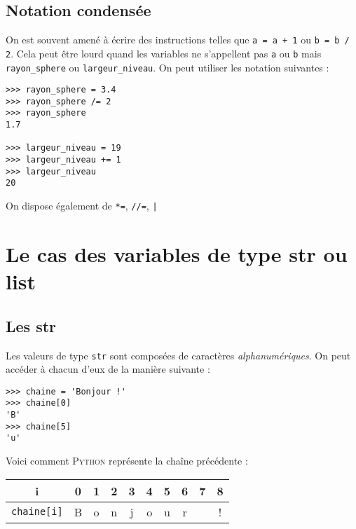 \subsection{Notation condensée}
On est souvent amené à écrire des instructions telles que  \texttt{a = a + 1} ou \texttt{b = b / 2}. Cela peut être lourd quand les variables ne s'appellent
pas \texttt{a} ou \texttt{b} mais \texttt{rayon_sphere} ou \texttt{largeur_niveau}. On peut utiliser les notation suivantes :
\begin{pyc}\begin{verbatim}
>>> rayon_sphere = 3.4
>>> rayon_sphere /= 2
>>> rayon_sphere
1.7

>>> largeur_niveau = 19
>>> largeur_niveau += 1
>>> largeur_niveau
20
\end{verbatim}
\end{pyc}

On dispose également de \texttt{*=}, \texttt{//=}, \texttt|%

\section{Le cas des variables de type str ou list}

\subsection{Les str}

Les valeurs de type \texttt{str} sont composées de caractères \emph{alphanumériques}. On peut accéder à chacun d'eux de la manière suivante :
\begin{pyc}\begin{verbatim}
>>> chaine = 'Bonjour !'
>>> chaine[0]
'B'
>>> chaine[5]
'u'
\end{verbatim}
\end{pyc}

Voici comment \textsc{Python} représente  la chaîne précédente :

\begin{center}
	\alternaterowcolors
	\tabstyle[UGLiBlue]
	\begin{tabular}{|c|c|c|c|c|c|c|c|c|c|}
		\hline
		\ccell  i    &  0 &   1 &   2 &   3 &   4 &   5 &   6 &   7 &   8 \\
		\hline
		\ccell \texttt{chaine[i]} & B      & o      & n      & j      & o      & u      & r      &        & !      \\
		\hline
	\end{tabular}
\end{center}

